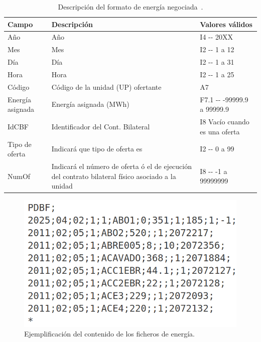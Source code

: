 \begin{table}[ht]
  \centering
  \begin{tabular}{|l|p{5cm}|l|}
    \hline
    Campo             & Descripción                                                                                       & Valores válidos                \\
    \hline
    Año               & Año                                                                                               & I4 {-}{-} 20XX                 \\
    Mes               & Mes                                                                                               & I2 {-}{-} 1 a 12               \\
    Día               & Día                                                                                               & I2 {-}{-} 1 a 31               \\
    Hora              & Hora                                                                                              & I2 {-}{-} 1 a 25               \\
    Código            & Código de la unidad (UP) ofertante                                                                & A7                             \\
    Energía asignada  & Energía asignada (MWh)                                                                            & F7.1 {-}{-} -99999.9 a 99999.9 \\
    IdCBF             & Identificador del Cont. Bilateral                                                                 & I8 Vacío cuando es una oferta  \\
    Tipo de oferta    & Indicará que tipo de oferta es                                                                    & I2 {-}{-} 0 a 99               \\
    NumOf             & Indicará el número de oferta ó el de ejecución del contrato bilateral físico asociado a la unidad & I8 {-}{-} -1 a 99999999        \\
    \hline
  \end{tabular}
  \caption[Descripción del formato de energía negociada.]{Descripción del formato de energía negociada~\cite{omie2025modelo}.}%
  \label{tab:descripción-energia}
\end{table}

\begin{figure}
  \centering
  \includegraphics[width=0.5\linewidth]{figures/contenido-energia.png}
  \caption[Ejemplificación del contenido de los ficheros de energía.]{Ejemplificación del contenido de los ficheros de energía.}%
  \label{fig:contenido-energia}
\end{figure}

